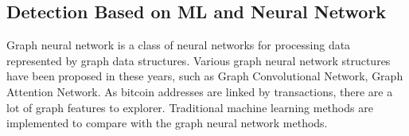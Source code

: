 \subsection{Detection Based on ML and Neural Network}
 
 Graph neural network is a class of neural networks for processing data represented by graph data structures. Various graph neural network structures have been proposed in these years, such as Graph Convolutional Network\cite{kipf2016semi}, Graph Attention Network\cite{velivckovic2017graph}. As bitcoin addresses are linked by transactions, there are a lot of graph features to explorer. Traditional machine learning methods are implemented to compare with the graph neural network methods.


